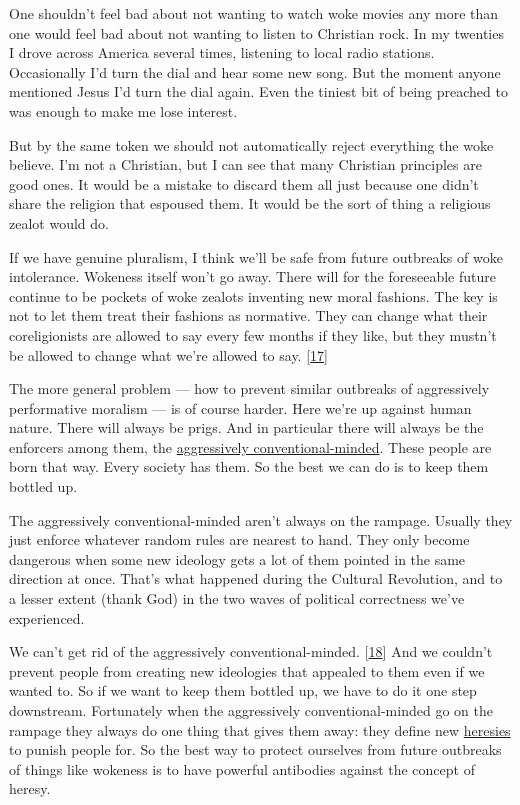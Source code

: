 One shouldn't feel bad about not wanting to watch woke movies any more
than one would feel bad about not wanting to listen to Christian rock.
In my twenties I drove across America several times, listening to local
radio stations. Occasionally I'd turn the dial and hear some new song.
But the moment anyone mentioned Jesus I'd turn the dial again. Even the
tiniest bit of being preached to was enough to make me lose interest.

But by the same token we should not automatically reject everything the
woke believe. I'm not a Christian, but I can see that many Christian
principles are good ones. It would be a mistake to discard them all just
because one didn't share the religion that espoused them. It would be
the sort of thing a religious zealot would do.

If we have genuine pluralism, I think we'll be safe from future
outbreaks of woke intolerance. Wokeness itself won't go away. There will
for the foreseeable future continue to be pockets of woke zealots
inventing new moral fashions. The key is not to let them treat their
fashions as normative. They can change what their coreligionists are
allowed to say every few months if they like, but they mustn't be
allowed to change what we're allowed to say. {[}\hyperref[f17n]{17}{]}

The more general problem --- how to prevent similar outbreaks of
aggressively performative moralism --- is of course harder. Here we're
up against human nature. There will always be prigs. And in particular
there will always be the enforcers among them, the
\href{conformism.html}{aggressively conventional-minded}. These people
are born that way. Every society has them. So the best we can do is to
keep them bottled up.

The aggressively conventional-minded aren't always on the rampage.
Usually they just enforce whatever random rules are nearest to hand.
They only become dangerous when some new ideology gets a lot of them
pointed in the same direction at once. That's what happened during the
Cultural Revolution, and to a lesser extent (thank God) in the two waves
of political correctness we've experienced.

We can't get rid of the aggressively conventional-minded.
{[}\hyperref[f18n]{18}{]} And we couldn't prevent people from creating
new ideologies that appealed to them even if we wanted to. So if we want
to keep them bottled up, we have to do it one step downstream.
Fortunately when the aggressively conventional-minded go on the rampage
they always do one thing that gives them away: they define new
\href{heresy.html}{heresies} to punish people for. So the best way to
protect ourselves from future outbreaks of things like wokeness is to
have powerful antibodies against the concept of heresy.

